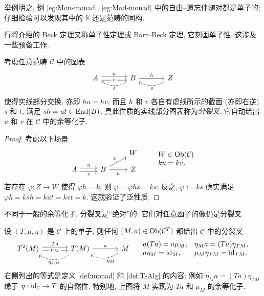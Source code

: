 举例明之, 例 \ref{eg:Mon-monad}, \ref{eg:Mod-monad} 中的自由--遗忘伴随对都是单子的; 仔细检验可以发现其中的 $\mathbb{K}$ 还是范畴的同构.

行将介绍的 Beck 定理又称单子性定理或 Barr--Beck 定理, 它刻画单子性. 这涉及一些预备工作.

\begin{definition-proposition}
	考虑任意范畴 $\mathcal{C}$ 中的图表
	\begin{equation*}\label{eqn:split-coeq}\begin{tikzcd}[column sep=large]
		A \arrow[shift left, r, "u"] \arrow[shift right, r, "v" description] & B \arrow[r, "h"] \arrow[dashed, l, bend left, "t"] & Z \arrow[dashed, l, bend left, "s"]
	\end{tikzcd}\end{equation*}
	使得实线部分交换, 亦即 $hu = hv$, 而且 $h$ 和 $v$ 各自有虚线所示的截面 (亦即右逆) $s$ 和 $t$, 满足 $sh = ut \in \operatorname{End}(B)$. 具此性质的实线部分图表称为\emph{分裂叉}. 它自动给出 $u$ 和 $v$ 在 $\mathcal{C}$ 中的余等化子.
\end{definition-proposition}
\begin{proof}
	考虑以下场景
	\[\begin{tikzcd}[row sep=small]
		& & W \\
		A \arrow[shift left, r, "u"] \arrow[shift right, r, "v"'] & B \arrow[r, "h"'] \arrow[ru, "k"] & Z
	\end{tikzcd} \qquad \begin{array}{ll}
		W \in \Obj(\mathcal{C}) \\
		ku = kv.
	\end{array} \]
	若存在 $\varphi: Z \to W$ 使得 $\varphi h = k$, 则 $\varphi = \varphi hs = ks$; 反之, $\varphi := ks$ 确实满足 $\varphi h = ksh = kut = kvt = k$. 这就验证了泛性质.
\end{proof}

不同于一般的余等化子, 分裂叉是``绝对''的: 它们对任意函子的像仍是分裂叉.

\begin{example}\label{eg:T-split-fork}
	设 $(T, \mu, \eta)$ 是 $\mathcal{C}$ 上的单子, 则任何 $(M, a) \in \operatorname{Ob}(\mathcal{C}^T)$ 都给出 $\mathcal{C}$ 中的分裂叉
	\begin{equation*}\begin{tikzcd}[column sep=large]
			T^2(M) \arrow[shift left, r, "Ta"] \arrow[shift right, r, "\mu_M" description] & T(M) \arrow[r, "a"] \arrow[dashed, bend left, l, "\eta_{TM}"] & M \arrow[dashed, bend left, l, "\eta_M"]
		\end{tikzcd} \quad \begin{array}{ll}
			a (Ta) = a \mu_M , & \eta_M a = (Ta) \eta_{TM}, \\
			a \eta_M = \identity_M , & \mu_M \eta_{TM} = \identity_{TM}.
	\end{array}\end{equation*}
	右侧列出的等式是定义 \ref{def:monad} 和 \ref{def:T-Alg} 的内容; 例如 $\eta_M a = (Ta) \eta_{TM}$ 缘于 $\eta: \mathrm{id}_{\mathcal{C}} \to T$ 的自然性. 特别地, 上图将 $M$ 实现为 $Ta$ 和 $\mu_M$ 的余等化子.
\end{example}

